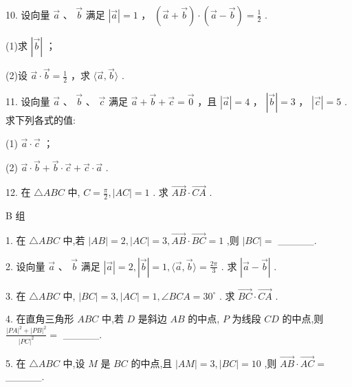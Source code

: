 \documentclass[10pt]{article}
\begin{document}
10. 设向量 \(\overrightarrow{a}\) 、 \(\overrightarrow{b}\) 满足 \(\left| \overrightarrow{a}\right|  = 1\) ， \(\left( {\overrightarrow{a} + \overrightarrow{b}}\right)  \cdot  \left( {\overrightarrow{a} - \overrightarrow{b}}\right)  = \frac{1}{2}\) .

(1)求 \(\left| \overrightarrow{b}\right|\) ；

(2)设 \(\overrightarrow{a} \cdot  \overrightarrow{b} = \frac{1}{2}\) ，求 \(\langle \overrightarrow{a},\overrightarrow{b}\rangle\) .

11. 设向量 \(\overrightarrow{a}\) 、 \(\overrightarrow{b}\) 、 \(\overrightarrow{c}\) 满足 \(\overrightarrow{a} + \overrightarrow{b} + \overrightarrow{c} = \overrightarrow{0}\) ，且 \(\left| \overrightarrow{a}\right|  = 4\) ， \(\left| \overrightarrow{b}\right|  = 3\) ， \(\left| \overrightarrow{c}\right|  = 5\) . 求下列各式的值:

(1) \(\overrightarrow{a} \cdot  \overrightarrow{c}\) ；

(2) \(\overrightarrow{a} \cdot  \overrightarrow{b} + \overrightarrow{b} \cdot  \overrightarrow{c} + \overrightarrow{c} \cdot  \overrightarrow{a}\) .

12. 在 \(\bigtriangleup {ABC}\) 中, \(C = \frac{\pi }{2},\left| {AC}\right|  = 1\) . 求 \(\overrightarrow{AB} \cdot  \overrightarrow{CA}\) .

B 组

1. 在 \(\bigtriangleup {ABC}\) 中,若 \(\left| {AB}\right|  = 2,\left| {AC}\right|  = 3,\overrightarrow{AB} \cdot  \overrightarrow{BC} = 1\) ,则 \(\left| {BC}\right|  =\) \_\_\_\_\_.

2. 设向量 \(\overrightarrow{a}\text{ 、 }\overrightarrow{b}\) 满足 \(\left| \overrightarrow{a}\right|  = 2,\left| \overrightarrow{b}\right|  = 1,\langle \overrightarrow{a},\overrightarrow{b}\rangle  = \frac{2\pi }{3}\) . 求 \(\left| {\overrightarrow{a} - \overrightarrow{b}}\right|\) .

3. 在 \(\bigtriangleup {ABC}\) 中, \(\left| {BC}\right|  = 3,\left| {AC}\right|  = 1,\angle {BCA} = {30}^{ \circ  }\) . 求 \(\overrightarrow{BC} \cdot  \overrightarrow{CA}\) .

4. 在直角三角形 \({ABC}\) 中,若 \(D\) 是斜边 \({AB}\) 的中点, \(P\) 为线段 \({CD}\) 的中点,则 \(\frac{{\left| PA\right| }^{2} + {\left| PB\right| }^{2}}{{\left| PC\right| }^{2}} =\) \_\_\_\_\_.

5. 在 \(\bigtriangleup {ABC}\) 中,设 \(M\) 是 \({BC}\) 的中点,且 \(\left| {AM}\right|  = 3,\left| {BC}\right|  = {10}\) ,则 \(\overrightarrow{AB} \cdot  \overrightarrow{AC} =\) \_\_\_\_\_.
\end{document}
